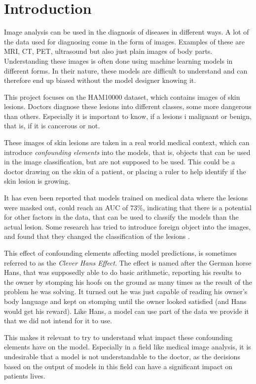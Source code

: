 \chapter{Introduction}\label{sec:introduction}
Image analysis can be used in the diagnosis of diseases in different ways.
A lot of the data used for diagnosing come in the form of images.
Examples of these are MRI, CT, PET, ultrasound but also just plain images of body parts.
Understanding these images is often done using machine learning models in different forms.
In their nature, these models are difficult to understand and can therefore end up biased without
the model designer knowing it.

This project focuses on the HAM10000 dataset\cite{Tschandl_2018}, which contains images of skin lesions.
Doctors diagnose these lesions into different classes, some more dangerous than others.
Especially it is important to know,
if a lesions i malignant or benign,
that is, if it is cancerous or not.

These images of skin lesions are taken in a real world medical context,
which can introduce \textit{confounding elements} into the models,
that is, objects that can be used in the image classification,
but are not supposed to be used.
This could be a doctor drawing on the skin of a patient,
or placing a ruler to help identify if the skin lesion is growing.

It has even been reported that models trained on medical data where the lesions were masked out,
could reach an AUC of $73\%$\cite{DeConstructing_Bias_on_Skin_Lesion_Datasets_2019},
indicating that there is a potential for other factors in the data,
that can be used to classify the models than the actual lesion.
Some research has tried to introduce foreign object into the images,
and found that they changed the classification of the lesions \cite{Towards_Explainable_Classifiers_Using_the_Counterfactual_Approach_2019}.

This effect of confounding elements affecting model predictions, 
is sometimes referred to as the \textit{Clever Hans Effect}.
The effect is named after the German horse Hans,
that was supposedly able to do basic arithmetic,
reporting his results to the owner by stomping his hoofs on the ground as many times as the result of the problem he was solving.
It turned out he was just capable of reading his owner's body language and kept on stomping until the owner looked satisfied (and Hans would get his reward).
Like Hans, a model can use part of the data we provide it that we did not intend for it to use.

This makes it relevant to try to understand what impact these confounding elements have on the model.
Especially in a field like medical image analysis,
it is undesirable that a model is not understandable to the doctor,
as the decisions based on the output of models in this field can have a significant impact on patients lives.